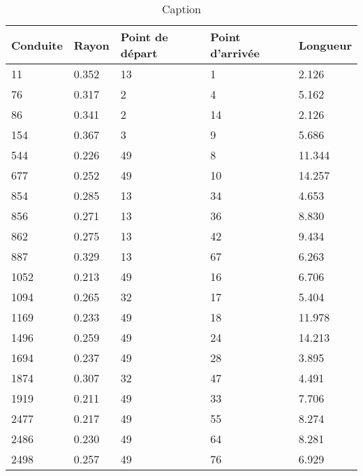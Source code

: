 \begin{table}[h]
  \centering
  \begin{tabular}{|l|l|l|l|l|}
      \hline
      \textbf{Conduite} & \textbf{Rayon} & \textbf{Point de départ} & \textbf{Point d'arrivée} & \textbf{Longueur} \\
      \hline
      11   & 0.352 & 13 & 1  & 2.126  \\ \hline
      76   & 0.317 & 2  & 4  & 5.162  \\ \hline
      86   & 0.341 & 2  & 14 & 2.126  \\ \hline
      154  & 0.367 & 3  & 9  & 5.686  \\ \hline
      544  & 0.226 & 49 & 8  & 11.344 \\ \hline
      677  & 0.252 & 49 & 10 & 14.257 \\ \hline
      854  & 0.285 & 13 & 34 & 4.653  \\ \hline
      856  & 0.271 & 13 & 36 & 8.830  \\ \hline
      862  & 0.275 & 13 & 42 & 9.434  \\ \hline
      887  & 0.329 & 13 & 67 & 6.263  \\ \hline
      1052 & 0.213 & 49 & 16 & 6.706  \\ \hline
      1094 & 0.265 & 32 & 17 & 5.404  \\ \hline
      1169 & 0.233 & 49 & 18 & 11.978 \\ \hline
      1496 & 0.259 & 49 & 24 & 14.213 \\ \hline
      1694 & 0.237 & 49 & 28 & 3.895  \\ \hline
      1874 & 0.307 & 32 & 47 & 4.491  \\ \hline
      1919 & 0.211 & 49 & 33 & 7.706  \\ \hline
      2477 & 0.217 & 49 & 55 & 8.274  \\ \hline
      2486 & 0.230 & 49 & 64 & 8.281  \\ \hline
      2498 & 0.257 & 49 & 76 & 6.929  \\ \hline
  \end{tabular}
  \caption{Caption}
  \label{tab:my_label}
\end{table}